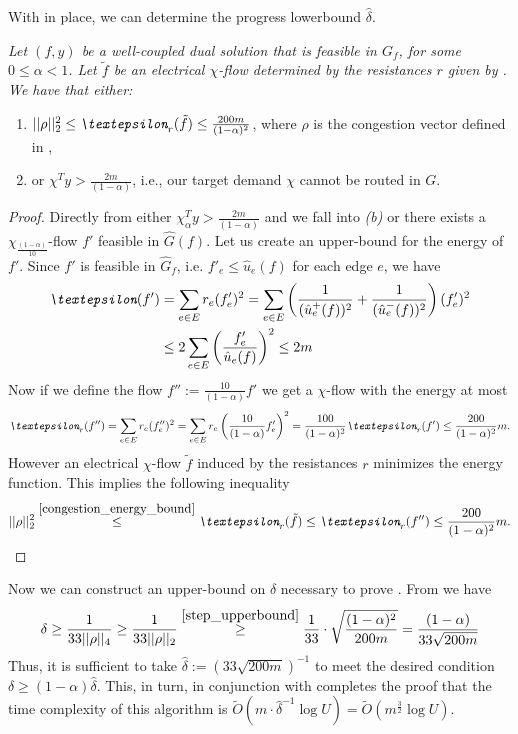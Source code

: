 With  in place, we can determine the progress lowerbound $\hat{\delta}$.
\begin{lemma}
\textit{Let $(f,y)$ be a well-coupled dual solution that is feasible in $G_f$, for some $0\le\alpha<1$. Let $\tilde  f$ be an electrical $\chi$-flow determined by the resistances $r$ given by  . We have that either:}
\begin{enumerate}[label=(\alph*)]
    \item $||\rho||_2^2\le\emph{\textepsilon}_r(\tilde  f)\le\frac{200m}{(1-\alpha)^2}$, where $\rho$ is the congestion vector defined in ,
    \item or $\chi^Ty>\frac{2m}{(1-\alpha)}$, i.e., our target demand $\chi$ cannot be routed in $G$.
\end{enumerate}
\end{lemma}
\begin{proof}
Directly from  either $\chi_\alpha^Ty>\frac{2m}{(1-\alpha)}$ and we fall into \textit{(b)} or there exists a $\chi_\frac{(1-\alpha)}{10}$-flow $f'$ feasible in $\hat G(f)$.
Let us create an upper-bound for the energy of $f'$. Since $f'$ is feasible in $\hat G_f$, i.e. $f'_e\le\hat u_e(f)$ for each edge $e$, we have
\begin{equation} 
\begin{split}
\emph{\textepsilon}(f')
&= \sum_{e\in E} r_e(f'_e)^2
= \sum_{e\in E}\left(\frac{1}{(\hat u_e^+(f))^2}+\frac{1}{(\hat u_e^-(f))^2}\right)(f'_e)^2\\
&\le 2\sum_{e\in E}\left(\frac{f'_e}{\hat u_e(f)}\right)^2
\le 2m
\end{split}
\end{equation}
Now if we define the flow $f'' := \frac{10}{(1-\alpha)}f'$ we get a $\chi$-flow with the energy at most
\[
\emph{\textepsilon}_r(f'')
= \sum_{e\in E} r_e(f''_e)^2
= \sum_{e\in E} r_e\left( \frac{10}{(1-\alpha)}f'_e\right)^2
= \frac{100}{(1-\alpha)^2} \emph{\textepsilon}_r(f')
\le \frac{200}{(1-\alpha)^2}m.
\]
However an electrical $\chi$-flow $\tilde f$ induced by the resistances $r$ minimizes the energy function. This implies the following inequality
\[
||\rho||_2^2
\stackrel{\ref{congestion_energy_bound}}{\le} \emph{\textepsilon}_r(\tilde f)
\le \emph{\textepsilon}_r(f'')
\le \frac{200}{(1-\alpha)^2}m.
\]
\end{proof}

Now we can construct an upper-bound on $\delta$ necessary to prove . From  we have
\[
\delta
\ge \frac{1}{33||\rho||_4}
\ge \frac{1}{33||\rho||_2}
\stackrel{\ref{step_upperbound}}{\ge} \frac{1}{33}\cdot\sqrt{\frac{(1-\alpha)^2}{200 m}}
= \frac{(1-\alpha)}{33\sqrt{200 m}}
\]
Thus, it is sufficient to take $\hat{\delta} := (33\sqrt{200 m})^{-1}$ to meet the desired condition $\delta \ge (1-\alpha)\hat{\delta}$.
This, in turn, in conjunction with  completes the proof that the time complexity of this algorithm is
$\tilde  O(m\cdot\hat{\delta}^{-1}\log U) = \tilde  O(m^\frac{3}{2}\log U)$.
